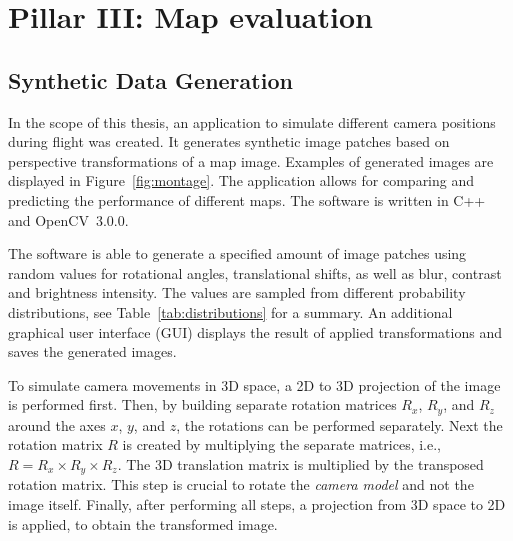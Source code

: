 \documentclass{report}
\begin{document}
\section{Pillar III: Map evaluation}
\label{sec:mapeval}

\subsection{Synthetic Data Generation}
\label{sec:syntheticdatageneration}

In the scope of this thesis, an application to simulate different
camera positions during flight was created. It generates synthetic
image patches based on perspective transformations of a map
image. Examples of generated images are displayed in
Figure~\ref{fig:montage}. The application allows for comparing and
predicting the performance of different maps. The software is written
in C++ and OpenCV~3.0.0.

The software is able to generate a specified amount of image patches
using random values for rotational angles, translational shifts, as
well as blur, contrast and brightness intensity. The values are
sampled from different probability distributions, see
Table~\ref{tab:distributions} for a summary. An additional graphical
user interface (GUI) displays the result of applied transformations
and saves the generated images.

To simulate camera movements in 3D space, a 2D to 3D projection of the
image is performed first. Then, by building separate rotation matrices
$R_x$, $R_y$, and $R_z$ around the axes $x$, $y$, and $z$, the
rotations can be performed separately. Next the rotation matrix $R$ is
created by multiplying the separate matrices, i.e.,
$R = R_x \times R_y \times R_z$. The 3D translation matrix is
multiplied by the transposed rotation matrix. This step is crucial to
rotate the \emph{camera model} and not the image itself. Finally,
after performing all steps, a projection from 3D space to 2D is
applied, to obtain the transformed image.
\end{document}
